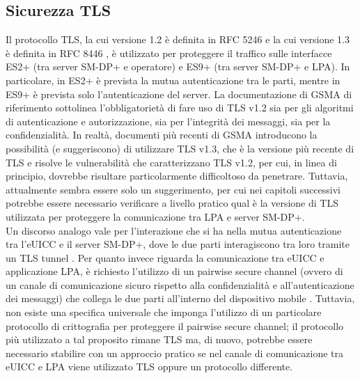 \documentclass[10pt, twoside, openany]{book}
\begin{document}
\subsection{Sicurezza TLS}
Il protocollo TLS, la cui versione 1.2 è definita in RFC 5246 \cite{RFC-5246} e la cui versione 1.3 è definita in RFC 8446 \cite{RFC-8446}, è utilizzato per proteggere il traffico sulle interfacce ES2+ (tra server SM-DP+ e operatore) e ES9+ (tra server SM-DP+ e LPA). In particolare, in ES2+ è prevista la mutua autenticazione tra le parti, mentre in ES9+ è prevista solo l'autenticazione del server. La documentazione di GSMA di riferimento \cite{GSMA-docs} sottolinea l'obbligatorietà di fare uso di TLS v1.2 sia per gli algoritmi di autenticazione e autorizzazione, sia per l'integrità dei messaggi, sia per la confidenzialità. In realtà, documenti più recenti di GSMA \cite{GSMA-docs2} introducono la possibilità (e suggeriscono) di utilizzare TLS v1.3, che è la versione più recente di TLS e risolve le vulnerabilità che caratterizzano TLS v1.2, per cui, in linea di principio, dovrebbe risultare particolarmente difficoltoso da penetrare. Tuttavia, attualmente sembra essere solo un suggerimento, per cui nei capitoli successivi potrebbe essere necessario verificare a livello pratico qual è la versione di TLS utilizzata per proteggere la comunicazione tra LPA e server SM-DP+.\\
Un discorso analogo vale per l'interazione che si ha nella mutua autenticazione tra l'eUICC e il server SM-DP+, dove le due parti interagiscono tra loro tramite un TLS tunnel \cite{Sec-analysis}. Per quanto invece riguarda la comunicazione tra eUICC e applicazione LPA, è richiesto l'utilizzo di un pairwise secure channel (ovvero di un canale di comunicazione sicuro rispetto alla confidenzialità e all'autenticazione dei messaggi) che collega le due parti all'interno del dispositivo mobile \cite{Sec-analysis}. Tuttavia, non esiste una specifica universale che imponga l'utilizzo di un particolare protocollo di crittografia per proteggere il pairwise secure channel; il protocollo più utilizzato a tal proposito rimane TLS ma, di nuovo, potrebbe essere necessario stabilire con un approccio pratico se nel canale di comunicazione tra eUICC e LPA viene utilizzato TLS oppure un protocollo differente.
\end{document}
